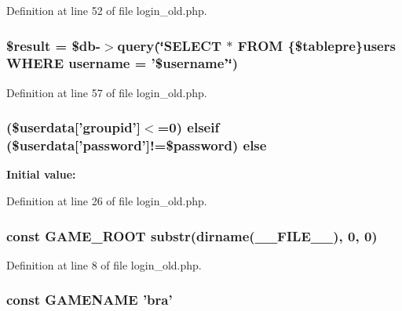 Definition at line 52 of file login\+\_\+old.\+php.

\hypertarget{login__old_8php_a112ef069ddc0454086e3d1e6d8d55d07}{
\subsubsection[{\$result}]{\setlength{\rightskip}{0pt plus 5cm}\${\bf result} = \$db-\/$>$query(\char`\"{}S\+E\+L\+E\+C\+T $\ast$ F\+R\+O\+M \{\$tablepre\}users W\+H\+E\+R\+E username = '\$username'\char`\"{})}}\label{login__old_8php_a112ef069ddc0454086e3d1e6d8d55d07}


Definition at line 57 of file login\+\_\+old.\+php.

\hypertarget{login__old_8php_af8cdd260460533dff40cf690aabc08c7}{
\subsubsection[{else}]{ (\$userdata\mbox{[}'groupid'\mbox{]}$<$=0) {\bf elseif} (\$userdata\mbox{[}'password'\mbox{]}!=\$password) else}}\label{login__old_8php_af8cdd260460533dff40cf690aabc08c7}
{\bfseries Initial value\+:}


Definition at line 26 of file login\+\_\+old.\+php.

\hypertarget{login__old_8php_a8e43cd27c8e744fff590983bc396aba3}{
\subsubsection[{G\+A\+M\+E\+\_\+\+R\+O\+O\+T}]{\setlength{\rightskip}{0pt plus 5cm}const G\+A\+M\+E\+\_\+\+R\+O\+O\+T substr(dirname(\+\_\+\+\_\+\+F\+I\+L\+E\+\_\+\+\_\+), 0, 0)}}\label{login__old_8php_a8e43cd27c8e744fff590983bc396aba3}


Definition at line 8 of file login\+\_\+old.\+php.

\hypertarget{login__old_8php_a3cd7223880b2f6a1d0bcb325ce43c606}{
\subsubsection[{G\+A\+M\+E\+N\+A\+M\+E}]{\setlength{\rightskip}{0pt plus 5cm}const G\+A\+M\+E\+N\+A\+M\+E 'bra'}}\label{login__old_8php_a3cd7223880b2f6a1d0bcb325ce43c606}


